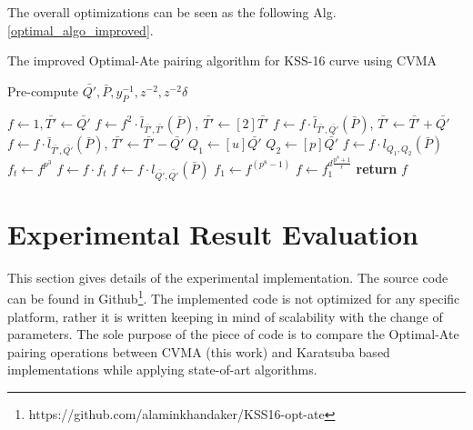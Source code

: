 The overall optimizations can be seen as the following Alg. \ref{optimal_algo_improved}.

\begin{algorithm}[ht]
	\caption{The improved Optimal-Ate pairing algorithm for KSS-16 curve using CVMA}
	\label{optimal_algo_improved}
	\DontPrintSemicolon
%	
%	

	 Pre-compute $\bar{Q'},\bar{P},y_{P}^{-1}, z^{-2}, z^{-2}\delta$ 
	
	 $f \leftarrow 1, \bar{T'} \leftarrow \bar{Q'}$\;
	  {
		 $f\leftarrow f^2\cdot \bar{l}_{\bar{T'},\bar{T'}}(\bar{P}) $, $ \bar{T'} \leftarrow [2] \bar{T'} $ 
		  {
			 $f\leftarrow f\cdot \bar{l}_{\bar{T'},\bar{Q'}}(\bar{P})$, $ \bar{T'} \leftarrow  \bar{T'} + \bar{Q'} $ }
		  {
			 $f\leftarrow f\cdot \bar{l}_{\bar{T'},\bar{Q'}}(\bar{P})$, $ \bar{T'} \leftarrow  \bar{T'} - \bar{Q'} $}} 
	 $Q_1\leftarrow [u]\bar{Q'}$  
	 $Q_2\leftarrow [p]\bar{Q'}$ 
	 $f\leftarrow f\cdot l_{Q_1,Q_2}(\bar{P})$ 
	 $f_t\leftarrow f^{p^3}$   
	 $f\leftarrow f\cdot f_t$ 
	 $f\leftarrow f\cdot l_{\bar{Q'},\bar{Q'}}(\bar{P})$ 
	 $f_1\leftarrow f^{(p^{8}-1)}$  
	 $f\leftarrow f_1^{d\frac{p^{8}+1}{r}}$  
	 {\bf return} $f$\;
\end{algorithm}


\section{Experimental Result Evaluation}\label{sec:4}
This section gives details of the experimental implementation. 
The source code can be found in Github\footnote{\label{source_code_cvma}https://github.com/alaminkhandaker/KSS16-opt-ate}. 
The implemented code is not optimized for any specific platform, rather it is written keeping in mind of scalability with the change of parameters.
The sole purpose of the piece of code is to compare the Optimal-Ate pairing operations between CVMA (this work) and Karatsuba based implementations \cite{INDOCRYPT:KNGDNK17} while applying state-of-art algorithms.


